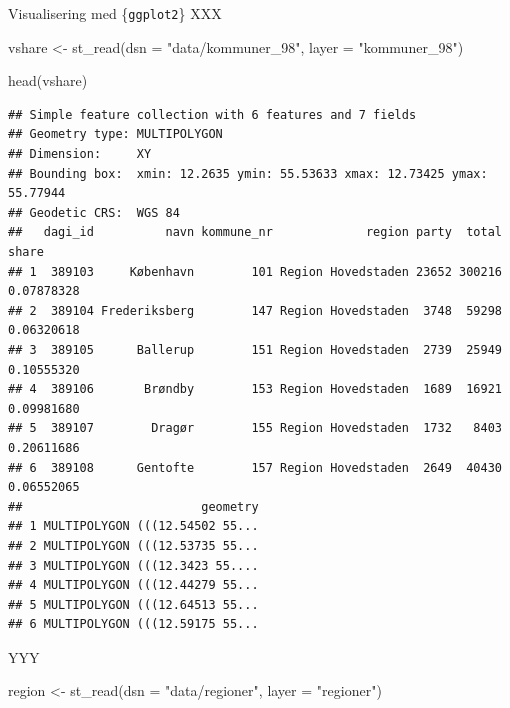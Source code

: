 \documentclass[
  8pt,
  ignorenonframetext,
  aspectratio=169]{beamer}
\newenvironment{Shaded}{}{}
\newcommand{\AttributeTok}[1]{\textcolor[rgb]{0.49,0.56,0.16}{#1}}
\newcommand{\FunctionTok}[1]{\textcolor[rgb]{0.02,0.16,0.49}{#1}}
\newcommand{\NormalTok}[1]{#1}
\newcommand{\OtherTok}[1]{\textcolor[rgb]{0.00,0.44,0.13}{#1}}
\newcommand{\StringTok}[1]{\textcolor[rgb]{0.25,0.44,0.63}{#1}}
\begin{document}
\begin{frame}[fragile]{Visualisering med \{\texttt{ggplot2}\}}
\protect\hypertarget{visualisering-med-ggplot2}{}
XXX

\tiny

\begin{Shaded}
\begin{Highlighting}[]
\NormalTok{vshare }\OtherTok{\textless{}{-}} \FunctionTok{st\_read}\NormalTok{(}\AttributeTok{dsn =} \StringTok{"data/kommuner\_98"}\NormalTok{,}
                  \AttributeTok{layer =} \StringTok{"kommuner\_98"}\NormalTok{)}
\end{Highlighting}
\end{Shaded}

\normalsize

\tiny

\begin{Shaded}
\begin{Highlighting}[]
\FunctionTok{head}\NormalTok{(vshare)}
\end{Highlighting}
\end{Shaded}

\begin{verbatim}
## Simple feature collection with 6 features and 7 fields
## Geometry type: MULTIPOLYGON
## Dimension:     XY
## Bounding box:  xmin: 12.2635 ymin: 55.53633 xmax: 12.73425 ymax: 55.77944
## Geodetic CRS:  WGS 84
##   dagi_id          navn kommune_nr             region party  total      share
## 1  389103     København        101 Region Hovedstaden 23652 300216 0.07878328
## 2  389104 Frederiksberg        147 Region Hovedstaden  3748  59298 0.06320618
## 3  389105      Ballerup        151 Region Hovedstaden  2739  25949 0.10555320
## 4  389106       Brøndby        153 Region Hovedstaden  1689  16921 0.09981680
## 5  389107        Dragør        155 Region Hovedstaden  1732   8403 0.20611686
## 6  389108      Gentofte        157 Region Hovedstaden  2649  40430 0.06552065
##                         geometry
## 1 MULTIPOLYGON (((12.54502 55...
## 2 MULTIPOLYGON (((12.53735 55...
## 3 MULTIPOLYGON (((12.3423 55....
## 4 MULTIPOLYGON (((12.44279 55...
## 5 MULTIPOLYGON (((12.64513 55...
## 6 MULTIPOLYGON (((12.59175 55...
\end{verbatim}

\normalsize

YYY

\tiny

\begin{Shaded}
\begin{Highlighting}[]
\NormalTok{region }\OtherTok{\textless{}{-}} \FunctionTok{st\_read}\NormalTok{(}\AttributeTok{dsn =} \StringTok{"data/regioner"}\NormalTok{,}
                  \AttributeTok{layer =} \StringTok{"regioner"}\NormalTok{)}
\end{Highlighting}
\end{Shaded}


\end{frame}
\end{document}
